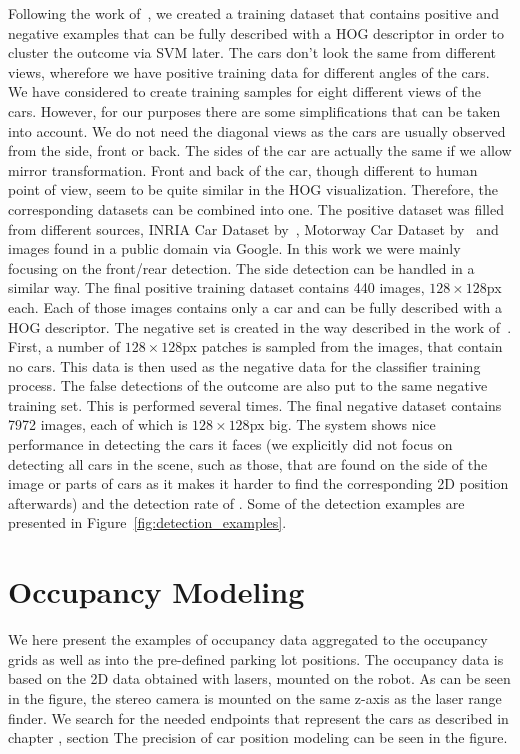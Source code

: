         Following the work of~\cite{dalal2005}, we created a training dataset that contains positive and negative examples that can be fully described with a HOG descriptor in order to cluster the outcome via SVM later. The cars don't look the same from different views, wherefore we have positive training data for different angles of the cars. We have considered to create training samples for eight different views of the cars. However, for our purposes there are some simplifications that can be taken into account. We do not need the diagonal views as the cars are usually observed from the side, front or back. The sides of the car are actually the same if we allow mirror transformation. Front and back of the car, though different to human point of view, seem to be quite similar in the HOG visualization. Therefore, the corresponding datasets can be combined into one.
        The positive dataset was filled from different sources, INRIA Car Dataset by~\cite{inriadata}, Motorway Car Dataset by~\cite{TMEMotorwayDataset} and images found in a public domain via Google.
        In this work we were mainly focusing on the front/rear detection. The side detection can be handled in a similar way.
        The final positive training dataset contains 440 images, $128 \times 128$px each. Each of those images contains only a car and can be fully described with a HOG descriptor.
        The negative set is created in the way described in the work of~\cite{dalal2005}. First, a number of $128 \times 128$px patches is sampled from the images, that contain no cars. This data is then used as the negative data for the classifier training process. The false detections of the outcome are also put to the same negative training set. This is performed several times. The final negative dataset contains 7972 images, each of which is $128 \times 128$px big.
        The system shows nice performance in detecting the cars it faces (we explicitly did not focus on detecting all cars in the scene, such as those, that are found on the side of the image or parts of cars as it makes it harder to find the corresponding 2D position afterwards) and the detection rate of . Some of the detection examples are presented in Figure~\ref{fig:detection_examples}.

    \section{Occupancy Modeling}\label{sec:occupancy_modeling}
        We here present the examples of occupancy data aggregated to the occupancy grids as well as into the pre-defined parking lot positions. The occupancy data is based on the 2D data obtained with lasers, mounted on the robot.  As can be seen in the figure, the stereo camera is mounted on the same z-axis as the laser range finder. We search for the needed endpoints that represent the cars as described in chapter , section 
        The precision of car position modeling can be seen in the figure. 

